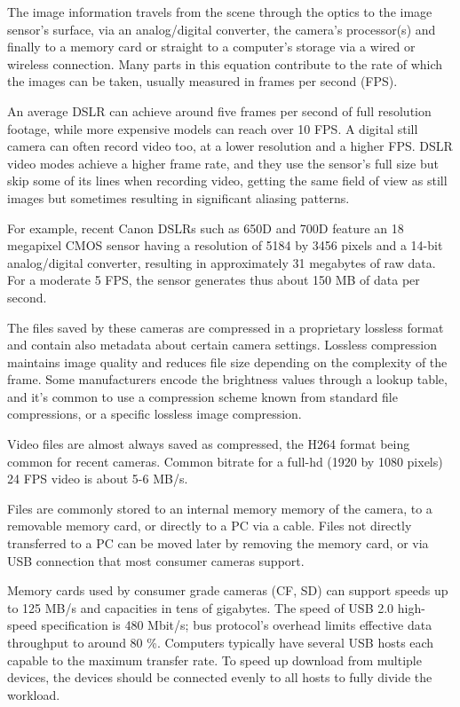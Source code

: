
The image information travels from the scene through the optics to the image sensor's surface, via an analog/digital converter, the camera's processor(s) and finally to a memory card or straight to a computer's storage via a wired or wireless connection.
Many parts in this equation contribute to the rate of which the images can be taken, usually measured in frames per second (FPS).


An average DSLR can achieve around five frames per second of full resolution footage, while more expensive models can reach over 10 FPS.
A digital still camera can often record video too, at a lower resolution and a higher FPS.
DSLR video modes achieve a higher frame rate, and they use the sensor's full size but skip some of its lines when recording video, getting the same field of view as still images but sometimes resulting in significant aliasing patterns. \cite{todo}


For example, recent Canon DSLRs such as 650D and 700D feature an 18 megapixel CMOS sensor having a resolution of 5184 by 3456 pixels and a 14-bit analog/digital converter, resulting in approximately 31 megabytes of raw data.
For a moderate 5 FPS, the sensor generates thus about 150 MB of data per second.


The files saved by these cameras are compressed in a proprietary lossless format and contain also metadata about certain camera settings.
Lossless compression maintains image quality and reduces file size depending on the complexity of the frame.
Some manufacturers encode the brightness values through a lookup table, and it's common to use a compression scheme known from standard file compressions, or a specific lossless image compression.

Video files are almost always saved as compressed, the H264 format being common for recent cameras.
Common bitrate for a full-hd (1920 by 1080 pixels) 24 FPS video is about 5-6 MB/s.


Files are commonly stored to an internal memory memory of the camera, to a removable memory card, or directly to a PC via a cable.
Files not directly transferred to a PC can be moved later by removing the memory card, or via USB connection that most consumer cameras support.

Memory cards used by consumer grade cameras (CF, SD) can support speeds up to 125 MB/s and capacities in tens of gigabytes.
The speed of USB 2.0 high-speed specification is 480 Mbit/s; bus protocol's overhead limits effective data throughput to around 80 \%.
Computers typically have several USB hosts each capable to the maximum transfer rate.
To speed up download from multiple devices, the devices should be connected evenly to all hosts to fully divide the workload.

